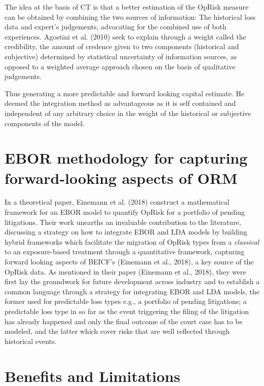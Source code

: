 \documentclass{DissertateUSU}
\begin{document}
The idea at the basis of CT is that a better estimation of the OpRisk
measure can be obtained by combining the two sources of information: The
historical loss data and expert's judgements, advocating for the
combined use of both experiences. Agostini et al. (2010) seek to explain
through a weight called the credibility, the amount of credence given to
two components (historical and subjective) determined by statistical
uncertainty of information sources, as opposed to a weighted average
approach chosen on the basis of qualitative judgements.\medskip

Thus generating a more predictable and forward looking capital estimate.
He deemed the integration method as advantageous as it is self contained
and independent of any arbitrary choice in the weight of the historical
or subjective components of the model.

\section{EBOR methodology for capturing forward-looking aspects of ORM}
\label{sec:EBOR methodology for capturing forward-looking aspects of ORM}

In a theoretical paper, Einemann et al. (2018) construct a mathematical
framework for an EBOR model to quantify OpRisk for a portfolio of
pending litigations. Their work unearths an invaluable contribution to
the literature, discussing a strategy on how to integrate EBOR and LDA
models by building hybrid frameworks which facilitate the migration of
OpRisk types from a \emph{classical} to an exposure-based treatment
through a quantitative framework, capturing forward looking aspects of
BEICF's (Einemann et al., 2018), a key source of the OpRisk data. As
mentioned in their paper (Einemann et al., 2018), they were first lay
the groundwork for future development across industry and to establish a
common language through a strategy for integrating EBOR and LDA models,
the former used for predictable loss types e.g., a portfolio of pending
litigations; a predictable loss type in so far as the event triggering
the filing of the litigation has already happened and only the final
outcome of the court case has to be modeled, and the latter which cover
risks that are well reflected through historical events.\medskip 

\section{Benefits and Limitations}
\label{sec:Benefits and Limitations}
\end{document}
